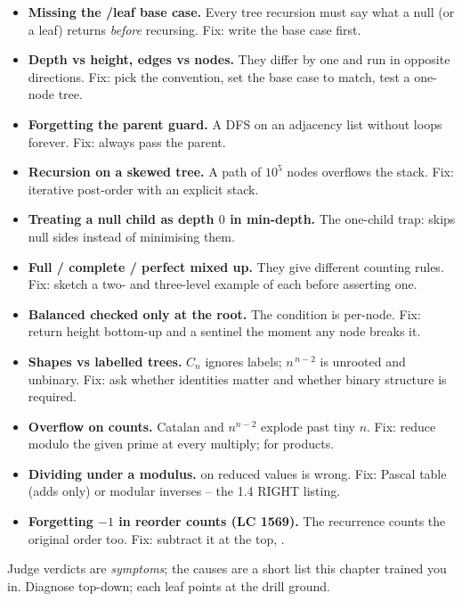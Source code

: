 \begin{itemize}[nosep, leftmargin=1.4em]
  \item \textbf{Missing the \nil{}/leaf base case.} Every tree recursion must say what a
        null (or a leaf) returns \emph{before} recursing. Fix: write the base case first.
  \item \textbf{Depth vs height, edges vs nodes.} They differ by one and run in opposite
        directions. Fix: pick the convention, set the base case to match, test a one-node tree.
  \item \textbf{Forgetting the parent guard.} A DFS on an adjacency list without
         loops forever. Fix: always pass the parent.
  \item \textbf{Recursion on a skewed tree.} A path of $10^5$ nodes overflows the stack.
        Fix: iterative post-order with an explicit stack.
  \item \textbf{Treating a null child as depth $0$ in min-depth.} The one-child trap:
         skips null sides instead of minimising them.
  \item \textbf{Full / complete / perfect mixed up.} They give different counting rules.
        Fix: sketch a two- and three-level example of each before asserting one.
  \item \textbf{Balanced checked only at the root.} The condition is per-node.
        Fix: return height bottom-up and a sentinel the moment any node breaks it.
  \item \textbf{Shapes vs labelled trees.} $C_n$ ignores labels; $n^{\,n-2}$ is unrooted
        and unbinary. Fix: ask whether identities matter and whether binary structure is required.
  \item \textbf{Overflow on counts.} Catalan and $n^{n-2}$ explode past tiny $n$.
        Fix: reduce modulo the given prime at every multiply;  for products.
  \item \textbf{Dividing under a modulus.} \code{/} on reduced values is wrong.
        Fix: Pascal table (adds only) or modular inverses -- the 1.4 RIGHT listing.
  \item \textbf{Forgetting $-1$ in reorder counts (LC 1569).} The recurrence counts the
        original order too. Fix: subtract it at the top, .
\end{itemize}


Judge verdicts are \emph{symptoms}; the causes are a short list this chapter trained you
in. Diagnose top-down; each leaf points at the drill ground.

